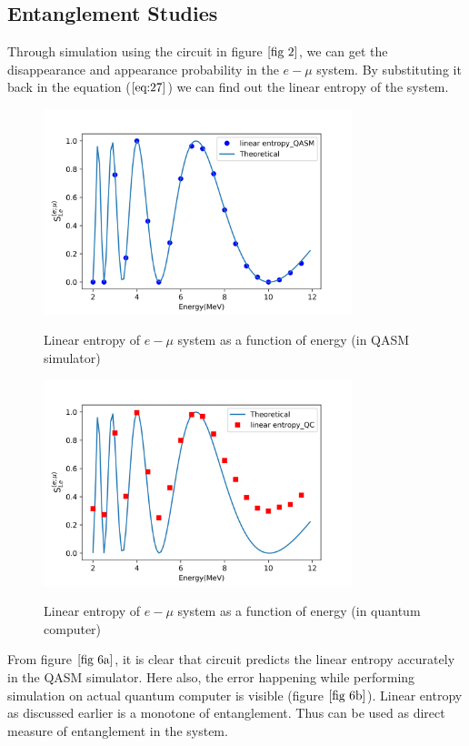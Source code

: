 \documentclass[12pt,a4paper]{report}
\begin{document}
\subsection{Entanglement Studies}
Through simulation using the circuit in figure $\ref{fig 2}$, we can get the disappearance and appearance probability in the $e-\mu$ system. By substituting it back in the equation ($\ref{eq:27}$) we can find out the linear entropy of the system.
\begin{figure}[H]
	\graphicspath{ {./Images/} }
	\centering	
	{\includegraphics[width=0.8\textwidth]{fig_6a.png}}
	\caption{Linear entropy of $e-\mu$ system as a function of energy (in QASM simulator)}
	\label{fig 6a}
\end{figure}
\begin{figure}[H]
	\graphicspath{ {./Images/} }
	\centering	
	{\includegraphics[width=0.8\textwidth]{fig_6b.png}}
	\caption{Linear entropy of $e-\mu$ system as a function of energy (in quantum computer)}
	\label{fig 6b}
\end{figure}
From figure $\ref{fig 6a}$, it is clear that circuit predicts the linear entropy accurately in the QASM simulator. Here also, the error happening while performing simulation on actual quantum computer is visible (figure $\ref{fig 6b}$). Linear entropy as discussed earlier is a monotone of entanglement. Thus can be used as direct measure of entanglement in the system. 
\end{document}
